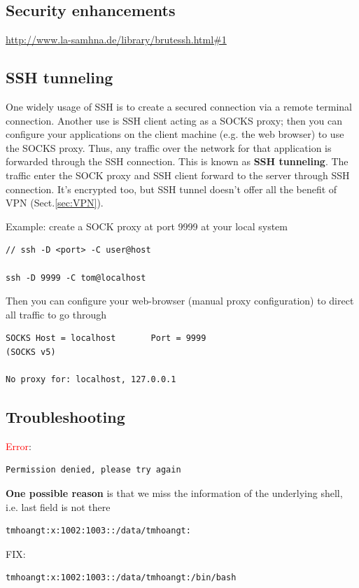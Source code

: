 \subsection{Security enhancements}

\url{http://www.la-samhna.de/library/brutessh.html#1}

\subsection{SSH tunneling}
\label{sec:SSH_tunneling}

One widely usage of SSH is to create a secured connection via a remote terminal
connection. Another use is SSH client acting as a SOCKS proxy; then you can
configure your applications on the client machine (e.g. the web browser) to use
the SOCKS proxy. Thus, any traffic over the network for that application is
forwarded through the SSH connection. This is known as {\bf SSH tunneling}.
The traffic enter the SOCK proxy and SSH client forward to the server through
SSH connection. It's encrypted too, but SSH tunnel doesn't offer all the benefit
of VPN (Sect.\ref{sec:VPN}).

Example: create a SOCK proxy at port 9999 at your local system
\begin{verbatim}
// ssh -D <port> -C user@host

ssh -D 9999 -C tom@localhost
\end{verbatim}
Then you can configure your web-browser (manual proxy configuration) to direct
all traffic to go through 
\begin{verbatim}
SOCKS Host = localhost       Port = 9999
(SOCKS v5)

No proxy for: localhost, 127.0.0.1
\end{verbatim}






\subsection{Troubleshooting}

\textcolor{red}{Error}:
\begin{verbatim}
Permission denied, please try again
\end{verbatim}

{\bf One possible reason } is that we miss the information of the underlying
shell, i.e. last field is not there
\begin{verbatim}
tmhoangt:x:1002:1003::/data/tmhoangt:
\end{verbatim}
FIX:
\begin{verbatim}
tmhoangt:x:1002:1003::/data/tmhoangt:/bin/bash
\end{verbatim}

